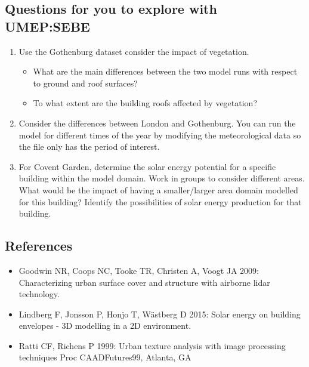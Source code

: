 \documentclass[letterpaper,10pt,english]{sphinxmanual}
\begin{document}
\subsection{Questions for you to explore with UMEP:SEBE}
\label{\detokenize{Tutorials/SEBE:questions-for-you-to-explore-with-umep-sebe}}\begin{enumerate}
\item {} 
Use the Gothenburg dataset consider the impact of vegetation.
\begin{itemize}
\item {} 
What are the main differences between the two model runs with
respect to ground and roof surfaces?

\item {} 
To what extent are the building roofs affected by vegetation?

\end{itemize}

\item {} 
Consider the differences between London and Gothenburg. You can run
the model for different times of the year by modifying the
meteorological data so the file only has the period of interest.

\item {} 
For Covent Garden, determine the solar energy potential for a
specific building within the model domain. Work in groups to consider
different areas. What would be the impact of having a smaller/larger
area domain modelled for this building? Identify the possibilities of
solar energy production for that building.

\end{enumerate}


\subsection{References}
\label{\detokenize{Tutorials/SEBE:references}}\begin{itemize}
\item {} 
Goodwin NR, Coops NC, Tooke TR, Christen A, Voogt JA 2009:
Characterizing urban surface cover and structure with airborne lidar
technology. 

\item {} 
Lindberg F, Jonsson P, Honjo T, Wästberg D 2015: Solar energy on
building envelopes - 3D modelling in a 2D environment. 

\item {} 
Ratti CF, Richens P 1999: Urban texture analysis with image
processing techniques Proc CAADFutures99, Atlanta, GA

\end{itemize}
\end{document}

